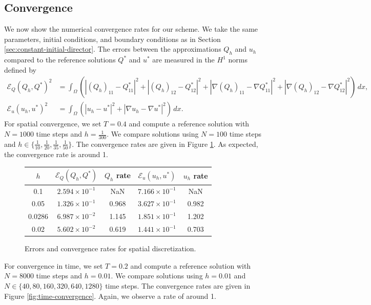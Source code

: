 \documentclass[10pt,letterpaper]{amsart}
\theoremstyle{definition}{\newtheorem{definition}[lemma]{Definition}}
\theoremstyle{note}{\newtheorem{claim}{Claim}[section]
\newtheorem*{claim*}{Claim}}
\numberwithin{equation}{section}
\begin{document}
\subsection{Convergence}
We now show the numerical convergence rates for our scheme. We take the same parameters, initial conditions, and boundary conditions as in Section \ref{sec:constant-initial-director}. The errors between the approximations $Q_h$ and $u_h$ compared to the reference solutions $Q^\ast$ and $u^\ast$ are measured in the $H^1$ norms defined by
\begin{align*}
    \mathcal{E}_Q(Q_h, Q^\ast)^2 &= \int_\Omega \left(|(Q_h)_{11} - Q^\ast_{11}|^2 + |(Q_h)_{12} - Q^\ast_{12}|^2 + |\nabla (Q_h)_{11} - \nabla Q^\ast_{11}|^2 + |\nabla (Q_h)_{12} - \nabla Q^\ast_{12}|^2\right)\, dx,\\ 
    \mathcal{E}_u(u_h, u^\ast)^2 &= \int_\Omega \left(|u_h - u^\ast|^2 + |\nabla u_h - \nabla u^\ast|^2\right)\, dx.
\end{align*}
For spatial convergence, we set $T = 0.4$ and compute a reference solution with $N = 1000$ time steps and $h = \frac{1}{300}$. We compare solutions using $N = 100$ time steps and $h \in \{\frac{1}{10}, \frac{1}{20}, \frac{1}{35}, \frac{1}{50}\}$. The convergence rates are given in Figure \ref{fig:spatial-convergence}. As expected, the convergence rate is around 1.

\begin{figure}[H]
\centering
\begin{tabular}{|c|c|c|c|c|}
    \hline
    $h$ & $\mathcal{E}_Q(Q_h, Q^\ast)$ & $Q_h$ rate & $\mathcal{E}_u(u_h, u^\ast)$ & $u_h$ rate \\
    \hline
    0.1 & $2.594\times 10^{-1}$ & NaN & $7.166\times 10^{-1}$ & NaN\\
    \hline
    0.05 & $1.326\times 10^{-1}$ & 0.968 & $3.627\times 10^{-1}$ & 0.982\\
    \hline
    0.0286 & $6.987 \times 10^{-2}$ & 1.145 & $1.851\times 10^{-1}$ & 1.202\\
    \hline
    0.02 & $5.602\times 10^{-2}$ & 0.619 & $1.441\times 10^{-1}$ & 0.703\\
    \hline
\end{tabular}
\caption{Errors and convergence rates for spatial discretization.}
\label{fig:spatial-convergence}
\end{figure}

For convergence in time, we set $T = 0.2$ and compute a reference solution with $N = 8000$ time steps and $h = 0.01$. We compare solutions using $h = 0.01$ and $N \in \{40, 80, 160, 320, 640, 1280\}$ time steps. The convergence rates are given in Figure \ref{fig:time-convergence}. Again, we observe a rate of around 1.
\end{document}
